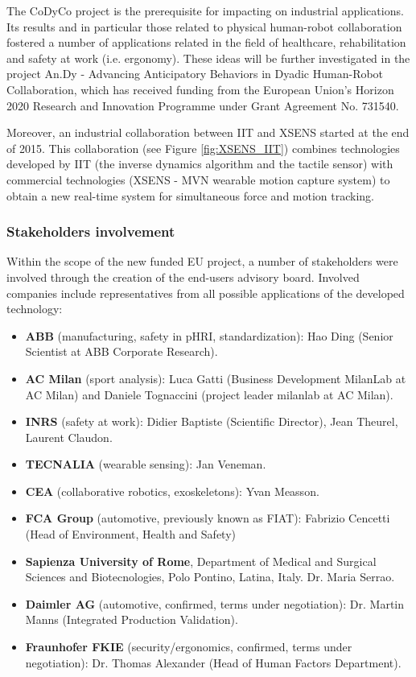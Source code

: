 \documentclass[12pt,a4paper,twoside]{article}
\begin{document}
The CoDyCo project is the prerequisite for impacting on industrial applications.
Its results and in particular those related to physical human-robot collaboration
fostered a number of applications related in the field of healthcare, rehabilitation
and safety at work (i.e. ergonomy). These ideas will be further investigated in 
the project An.Dy - Advancing Anticipatory Behaviors in Dyadic Human-Robot Collaboration,
which has received funding from the European Union's Horizon 2020 Research and Innovation Programme under Grant Agreement No. 731540.

Moreover, an industrial collaboration between IIT and XSENS started at the end of 
2015. This collaboration (see Figure \ref{fig:XSENS_IIT}) combines technologies
developed by IIT (the inverse dynamics algorithm and the tactile sensor) 
with commercial technologies (XSENS - MVN wearable motion capture system)
to obtain a new real-time system for simultaneous force and motion tracking.

\subsubsection{Stakeholders involvement}

Within the scope of the new funded EU project, a number of stakeholders were
involved through the creation of the end-users advisory board. Involved companies 
include representatives from all possible applications of the developed technology:

\begin{itemize}
\item \textbf{ABB} (manufacturing, safety in pHRI, standardization): Hao Ding (Senior Scientist at ABB Corporate Research).
\item \textbf{AC Milan} (sport analysis): Luca Gatti (Business Development MilanLab at AC Milan) and Daniele Tognaccini (project leader milanlab at AC Milan).
\item \textbf{INRS} (safety at work): Didier Baptiste (Scientific Director), Jean Theurel, Laurent Claudon.
\item \textbf{TECNALIA} (wearable sensing): Jan Veneman.
\item \textbf{CEA} (collaborative robotics, exoskeletons): Yvan Measson.
\item \textbf{FCA Group} (automotive, previously known as FIAT): Fabrizio Cencetti (Head of Environment, Health and Safety)
\item \textbf{Sapienza University of Rome}, Department of Medical and Surgical Sciences and Biotecnologies, Polo Pontino, Latina, Italy. Dr. Maria Serrao. 
\item \textbf{Daimler AG} (automotive, confirmed, terms under negotiation): Dr. Martin Manns (Integrated Production Validation).
\item \textbf{Fraunhofer FKIE} (security/ergonomics, confirmed, terms under negotiation): Dr. Thomas Alexander (Head of Human Factors Department).
\end{itemize}
\end{document}

